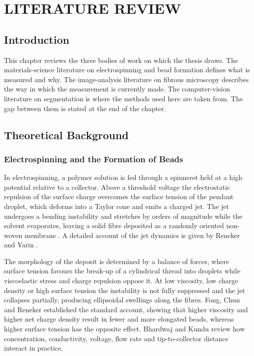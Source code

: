 \chapter{LITERATURE REVIEW}
\label{ch:literature}

\section{Introduction}

This chapter reviews the three bodies of work on which the thesis draws. The
materials-science literature on electrospinning and bead formation defines what is
measured and why. The image-analysis literature on fibrous microscopy describes
the way in which the measurement is currently made. The computer-vision literature
on segmentation is where the methods used here are taken from. The gap between them is stated at the end of the chapter.

\section{Theoretical Background}

\subsection{Electrospinning and the Formation of Beads}

In electrospinning, a polymer solution is fed through a spinneret held at a high
potential relative to a collector. Above a threshold voltage the electrostatic
repulsion of the surface charge overcomes the surface tension of the pendant
droplet, which deforms into a Taylor cone and emits a charged jet. The jet
undergoes a bending instability and stretches by orders of magnitude while the
solvent evaporates, leaving a solid fibre deposited as a randomly oriented
non-woven membrane \cite{doshi1995electrospinning, huang2003review}. A detailed account
of the jet dynamics is given by Reneker and Yarin
\cite{reneker2008electrospinning}.

The morphology of the deposit is determined by a balance of forces, where surface
tension favours the break-up of a cylindrical thread into droplets while
viscoelastic stress and charge repulsion oppose it. At low viscosity, low charge
density or high surface tension the instability is not fully suppressed and the
jet collapses partially, producing ellipsoidal swellings along the fibres. Fong,
Chun and Reneker \cite{fong1999beaded} established the standard account, showing
that higher viscosity and higher net charge density result in fewer and more
elongated beads, whereas higher surface tension has the opposite effect. Bhardwaj
and Kundu \cite{bhardwaj2010electrospinning} review how concentration,
conductivity, voltage, flow rate and tip-to-collector distance interact in
practice.

